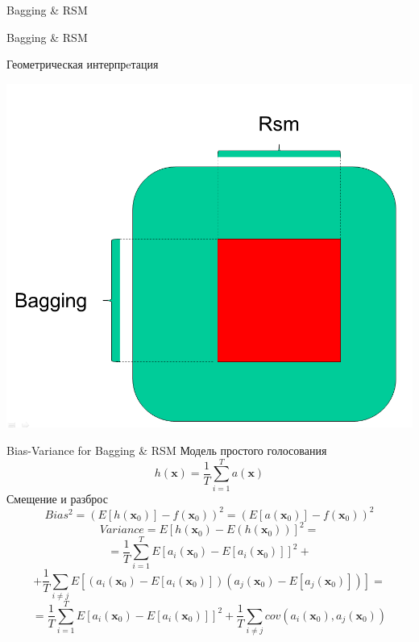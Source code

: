\documentclass[10pt]{beamer}
\begin{document}
\begin{frame}{Bagging \& RSM}
\bagging
\end{frame}

\begin{frame}{Bagging \& RSM}
\begin{block}{Геометрическая интерпрeтация}
\end{block}
\begin{center}
    \includegraphics[scale=0.2]{images/baggingandrsm.png}
\end{center}
\end{frame}

\begin{frame}{Bias-Variance for Bagging \& RSM}
Модель простого голосования
\[
    h(\mathbf{x}) = \frac{1}{T} \sum \limits _{i=1}^T a(\mathbf{x})
\]
Смещение и разброс
\[
    Bias^2 = (E[h(\mathbf{x}_0)] - f(\mathbf{x}_0))^2 = (E[a(\mathbf{x}_0)] -
    f(\mathbf{x}_0))^2 
\]
\[
    Variance = E[h(\mathbf{x}_0) - E(h(\mathbf{x}_0))]^2 =
\]
\[
    = \frac{1}{T} \sum
    \limits_{i=1}^T E[a_i(\mathbf{x}_0) - E[a_i(\mathbf{x}_0)]]^2 + 
\]
\[
    +\frac{1}{T} \sum \limits
    _{i \neq j} E[(a_i(\mathbf{x}_0) -
    E[a_i(\mathbf{x}_0)])(a_j(\mathbf{x}_0) - E[a_j(\mathbf{x}_0)])] =
\]
\[
    = \frac{1}{T} \sum \limits_{i=1}^T E[a_i(\mathbf{x}_0) -
    E[a_i(\mathbf{x}_0)]]^2 + \frac{1}{T} \sum \limits _{i \neq j}
    cov(a_i(\mathbf{x}_0), a_j(\mathbf{x}_0))
\]
\end{frame}

\end{document}
